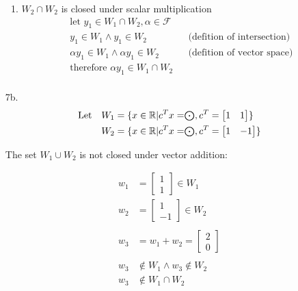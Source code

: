\documentclass[12pt,fleqn,leqno,letterpaper]{article}
\begin{document}
\begin{itemize}
\begin{enumerate}
			\item $W_{2} \cap W_{2}$ is closed under scalar multiplication
				\begin{align*}
					& \text{let } y_{1} \in W_{1} \cap W_{2}, \alpha \in \mathscr{F} && \\
					& y_{1} \in W_{1} \wedge y_{1} \in W_{2} && \text{(defition of intersection)}\\
					& \alpha y_{1} \in W_{1} \wedge \alpha y_{1} \in W_{2} && \text{(defition of vector space)}\\
					& \text{therefore } \alpha y_{1} \in W_{1} \cap W_{2} &&\\
				\end{align*}
		\end{enumerate}

	\item[7b.]
		\begin{align*}
			& \text{Let} && W_{1} = \{ x \in \mathbb{R} | c^{T} x = \mathrel{\mathsmaller{\bigodot}},
		c^{T} = \begin{bmatrix} 1 & 1\end{bmatrix}\}\\
			&            && W_{2}= \{ x \in \mathbb{R} | c^{T} x = \mathrel{\mathsmaller{\bigodot}},
		c^{T} = \begin{bmatrix} 1 & -1\end{bmatrix}\}
		\end{align*}

		The set $W_{1} \cup W_{2}$ is not closed under vector addition:

		\begin{align*}
			w_{1} &= \begin{bmatrix} 1 \\ 1 \end{bmatrix} \in W_{1}\\
			w_{2} &= \begin{bmatrix} 1 \\ -1 \end{bmatrix} \in W_{2}\\\\
			w_{3} &= w_{1} + w_{2} = \begin{bmatrix} 2 \\ 0 \end{bmatrix}\\\\
			w_{3} &\notin W_{1} \wedge w_{3} \notin W_{2}\\
			w_{3} &\notin W_{1} \cap W_{2}
		\end{align*}
\end{itemize}
\end{document}
